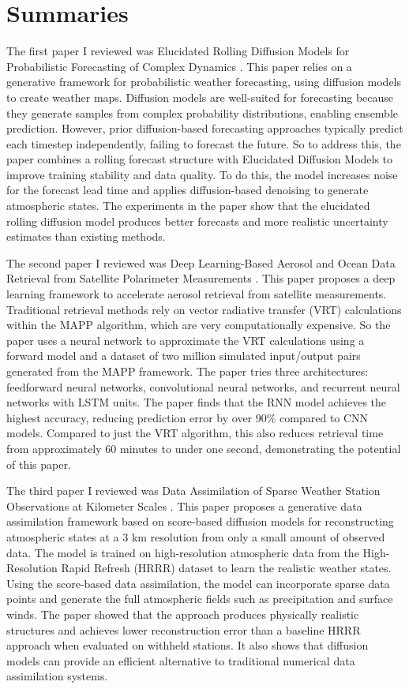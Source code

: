 \documentclass[12pt]{article}
\begin{document}
\section{Summaries}

The first paper I reviewed was Elucidated Rolling Diffusion Models for Probabilistic Forecasting of Complex Dynamics \cite{cachay2025elucidated}. This paper relies on a generative framework for probabilistic weather forecasting, using diffusion models to create weather maps. Diffusion models are well-suited for forecasting because they generate samples from complex probability distributions, enabling ensemble prediction. However, prior diffusion-based forecasting approaches typically predict each timestep independently, failing to forecast the future. So to address this, the paper combines a rolling forecast structure with Elucidated Diffusion Models to improve training stability and data quality. To do this, the model increases noise for the forecast lead time and applies diffusion-based denoising to generate atmospheric states. The experiments in the paper show that the elucidated rolling diffusion model produces better forecasts and more realistic uncertainty estimates than existing methods.

The second paper I reviewed was Deep Learning-Based Aerosol and Ocean Data Retrieval from Satellite Polarimeter Measurements \cite{wang2025deeplearning}. This paper proposes a deep learning framework to accelerate aerosol retrieval from satellite measurements. Traditional retrieval methods rely on vector radiative transfer (VRT) calculations within the MAPP algorithm, which are very computationally expensive. So the paper uses a neural network to approximate the VRT calculations using a forward model and a dataset of two million simulated input/output pairs generated from the MAPP framework. The paper tries three architectures: feedforward neural networks, convolutional neural networks, and recurrent neural networks with LSTM units. The paper finds that the RNN model achieves the highest accuracy, reducing prediction error by over 90\% compared to CNN models. Compared to just the VRT algorithm, this also reduces retrieval time from approximately 60 minutes to under one second, demonstrating the potential of this paper.

The third paper I reviewed was Data Assimilation of Sparse Weather Station Observations at Kilometer Scales \cite{manshausen2025generative}. This paper proposes a generative data assimilation framework based on score-based diffusion models for reconstructing atmospheric states at a 3 km resolution from only a small amount of observed data. The model is trained on high-resolution atmospheric data from the High-Resolution Rapid Refresh (HRRR) dataset to learn the realistic weather states. Using the score-based data assimilation, the model can incorporate sparse data points and generate the full atmospheric fields such as precipitation and surface winds. The paper showed that the approach produces physically realistic structures and achieves lower reconstruction error than a baseline HRRR approach when evaluated on withheld stations. It also shows that diffusion models can provide an efficient alternative to traditional numerical data assimilation systems.
\end{document}
